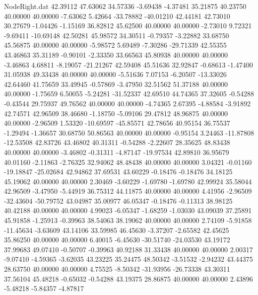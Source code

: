 \begin{filecontents}{NodeRight.dat}
  42.39112   47.63062   34.57336    -3.69438   -4.37481   35.21875   40.23750   40.00000   40.00000   -7.63062    5.42664  -33.78882  -40.01210
  42.44181   42.73010   30.27679    -1.04426   -1.15169   36.82812   45.62500   40.00000   40.00000   -2.73010    9.72321   -9.69411  -10.69148
  42.50281   45.98572   34.30511    -0.79357   -3.22882   33.68750   45.56875   40.00000   40.00000   -5.98572    5.69489   -7.30286  -29.71339
  42.55355   43.46863   35.31189    -0.90101   -2.33350   33.66563   45.80938   40.00000   40.00000   -3.46863    4.68811   -8.19057  -21.21267
  42.59408   45.51636   32.92847    -0.68613   -1.47400   31.05938   49.33438   40.00000   40.00000   -5.51636    7.07153   -6.20507  -13.33026
  42.64460   41.75659   33.49945    -0.57869   -3.47950   32.51562   51.37188   40.00000   40.00000   -1.75659    6.50055   -5.24281  -31.52337
  42.69510   44.74365   37.32605    -0.54288   -0.43544   29.75937   49.76562   40.00000   40.00000   -4.74365    2.67395   -4.88584   -3.91892
  42.74571   42.96509   38.46680    -1.18750   -5.09106   29.47812   48.96875   40.00000   40.00000   -2.96509    1.53320  -10.69597  -45.85571
  42.78656   40.95154   36.75537    -1.29494   -1.36657   30.68750   50.86563   40.00000   40.00000   -0.95154    3.24463  -11.87808  -12.53508
  42.83726   43.46802   40.31311    -0.54288   -2.22607   28.35625   48.83438   40.00000   40.00000   -3.46802   -0.31311   -4.87147  -19.97534
  42.89810   36.95679   40.01160    -2.11863   -2.76325   32.94062   48.48438   40.00000   40.00000    3.04321   -0.01160  -19.18847  -25.02684
  42.94862   37.69531   43.60229    -0.18476   -0.18476   34.18125   45.19062   40.00000   40.00000    2.30469   -3.60229   -1.69780   -1.69780
  42.99924   35.58044   42.96509    -3.47950   -5.44919   36.75312   44.11875   40.00000   40.00000    4.41956   -2.96509  -32.43604  -50.79752
  43.04987   35.00977   46.05347    -0.18476   -0.11313   38.98125   40.42188   40.00000   40.00000    4.99023   -6.05347   -1.68259   -1.03030
  43.09039   37.25891   45.91858    -1.25913   -0.39963   38.54063   38.19062   40.00000   40.00000    2.74109   -5.91858  -11.45634   -3.63609
  43.14106   33.59985   46.45630    -3.37207   -2.65582   42.45625   35.86250   40.00000   40.00000    6.40015   -6.45630  -30.51740  -24.03530
  43.19172   37.99683   49.07410    -0.50707   -0.39963   40.92188   31.33438   40.00000   40.00000    2.00317   -9.07410   -4.59365   -3.62035
  43.23225   35.24475   48.50342    -3.51532   -2.94232   43.44375   28.63750   40.00000   40.00000    4.75525   -8.50342  -31.93956  -26.73338
  43.30311   37.56104   45.48218    -0.65032   -0.54288   43.19375   28.86875   40.00000   40.00000    2.43896   -5.48218   -5.84357   -4.87817

\end{filecontents}
